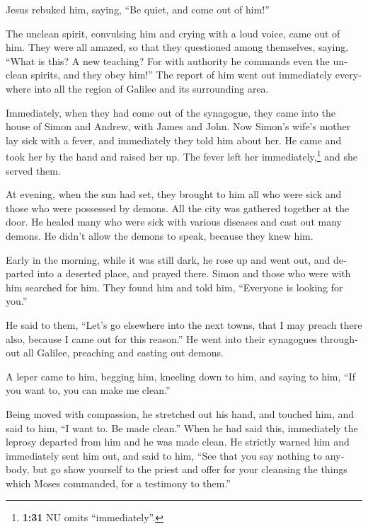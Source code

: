 \begin{paracol}{2}
\begin{otherlanguage}{english}
 Jesus rebuked him, saying, ``Be quiet, and come out of
him!''

 The unclean spirit, convulsing him and crying with a
loud voice, came out of him.  They were all amazed, so
that they questioned among themselves, saying, ``What is this? A new
teaching? For with authority he commands even the unclean spirits, and
they obey him!''  The report of him went out immediately
everywhere into all the region of Galilee and its surrounding area.

 Immediately, when they had come out of the synagogue,
they came into the house of Simon and Andrew, with James and John.
 Now Simon's wife's mother lay sick with a fever, and
immediately they told him about her.  He came and took
her by the hand and raised her up. The fever left her
immediately,\footnote{\textbf{1:31} NU omits ``immediately''.} and she
served them.

 At evening, when the sun had set, they brought to him
all who were sick and those who were possessed by demons.
 All the city was gathered together at the door.
 He healed many who were sick with various diseases and
cast out many demons. He didn't allow the demons to speak, because they
knew him.

 Early in the morning, while it was still dark, he rose
up and went out, and departed into a deserted place, and prayed there.
 Simon and those who were with him searched for him.
 They found him and told him, ``Everyone is looking for
you.''

 He said to them, ``Let's go elsewhere into the next
towns, that I may preach there also, because I came out for this
reason.''  He went into their synagogues throughout all
Galilee, preaching and casting out demons.

 A leper came to him, begging him, kneeling down to him,
and saying to him, ``If you want to, you can make me clean.''

 Being moved with compassion, he stretched out his hand,
and touched him, and said to him, ``I want to. Be made clean.''
 When he had said this, immediately the leprosy departed
from him and he was made clean.  He strictly warned him
and immediately sent him out,  and said to him, ``See
that you say nothing to anybody, but go show yourself to the priest and
offer for your cleansing the things which Moses commanded, for a
testimony to them.''


\end{otherlanguage}
\end{paracol}
